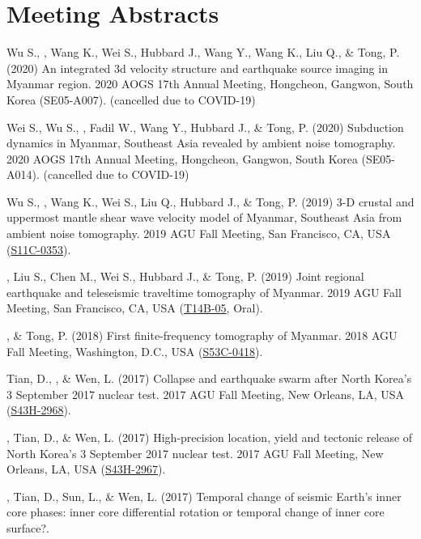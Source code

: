 \section*{Meeting Abstracts}
\begin{etaremune}
\item Wu S., \Yao, Wang K., Wei S., Hubbard J., Wang Y., Wang K., Liu Q., \& Tong, P. (2020)
    An integrated 3d velocity structure and earthquake source imaging in Myanmar region.
    2020 AOGS 17th Annual Meeting, Hongcheon, Gangwon, South Korea (SE05-A007). (cancelled due to COVID-19)
\item
    Wei S., Wu S., \Yao, Fadil W., Wang Y., Hubbard J., \& Tong, P. (2020)
    Subduction dynamics in Myanmar, Southeast Asia revealed by ambient noise tomography.
    2020 AOGS 17th Annual Meeting, Hongcheon, Gangwon, South Korea (SE05-A014). (cancelled due to COVID-19)
\item
    Wu S., \Yao, Wang K., Wei S., Liu Q., Hubbard J., \& Tong, P. (2019)
    3-D crustal and uppermost mantle shear wave velocity model of Myanmar, Southeast Asia from ambient noise tomography.
    2019 AGU Fall Meeting, San Francisco, CA, USA (\href{https://agu.confex.com/agu/fm19/meetingapp.cgi/Paper/511238}{S11C-0353}).
\item
    \Yao, Liu S., Chen M., Wei S., Hubbard J., \& Tong, P. (2019)
    Joint regional earthquake and teleseismic traveltime tomography of Myanmar.
    2019 AGU Fall Meeting, San Francisco, CA, USA (\href{https://agu.confex.com/agu/fm19/meetingapp.cgi/Paper/532179}{T14B-05}, Oral).
\item
    \Yao, \& Tong, P. (2018)
    First finite-frequency tomography of Myanmar.
    2018 AGU Fall Meeting, Washington, D.C., USA (\href{http://adsabs.harvard.edu/abs/2018AGUFM.S53C0418Y}{S53C-0418}).
\item
    Tian, D., \Yao, \& Wen, L. (2017)
    Collapse and earthquake swarm after North Korea's 3 September 2017 nuclear test.
    2017 AGU Fall Meeting, New Orleans, LA, USA (\href{http://adsabs.harvard.edu/abs/2017AGUFM.S43H2968T}{S43H-2968}).
\item
    \Yao, Tian, D., \& Wen, L. (2017)
    High-precision location, yield and tectonic release of North Korea's 3 September 2017 nuclear test.
    2017 AGU Fall Meeting, New Orleans, LA, USA (\href{http://adsabs.harvard.edu/abs/2017AGUFM.S43H2967Y}{S43H-2967}).
\item
    \Yao, Tian, D., Sun, L., \& Wen, L. (2017)
    Temporal change of seismic Earth's inner core phases: inner core differential rotation or temporal change of inner core surface?.

\end{etaremune}
